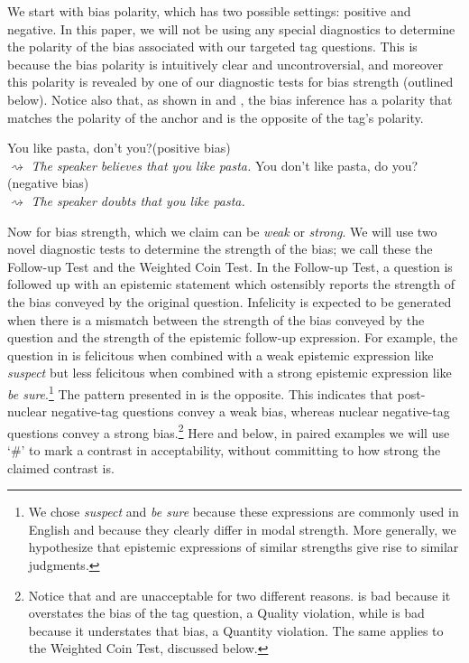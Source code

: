 \documentclass[output=paper,colorlinks,citecolor=brown]{langscibook}
\begin{document}
We start with bias polarity, which has two possible settings: positive and negative. In this paper, we will not be using any special diagnostics to determine the polarity of the bias associated with our targeted tag questions. This is because the bias polarity is intuitively clear and uncontroversial, and moreover this polarity is revealed by one of our diagnostic tests for bias strength (outlined below). Notice also that, as shown in  and , the bias inference has a polarity that matches the polarity of the anchor and is the opposite of the tag's polarity. 

\is{}
\ea You like pasta, don't you?\hfill(positive bias)\\ $\rightsquigarrow$ \textit{The speaker believes that you like pasta.}\label{Bias.Pos}
\ex You don't like pasta, do you?\hfill(negative bias)\\ $\rightsquigarrow$ \textit{The speaker doubts that  you like pasta.}\label{Bias.Neg}
\z
{}

Now for bias strength, which we claim can be \textit{weak} or \textit{strong}. We will use two novel diagnostic tests to determine the strength of the bias; we call these the Follow-up Test and the Weighted Coin Test. In the Follow-up Test, a question is followed up with an epistemic statement which ostensibly reports the strength of the bias conveyed by the original question. Infelicity is expected to be generated when there is a mismatch between the strength of the bias conveyed by the question and the strength of the epistemic follow-up expression. For example, the question in  is felicitous when combined with a weak epistemic expression like \textit{suspect} but less felicitous when combined with a strong epistemic expression like \textit{be sure}.\footnote{We chose \textit{suspect} and \textit{be sure} because these expressions are commonly used in English and because they clearly differ in modal strength. More generally, we hypothesize that epistemic expressions of similar strengths give rise to similar judgments. } The pattern presented in  is the opposite. This indicates that  post-nuclear negative-tag questions convey a weak bias, whereas  nuclear negative-tag questions convey a strong bias.\footnote{Notice that  and  are unacceptable for two different reasons.  is bad because it overstates the bias of the tag question, a Quality violation,  while  is bad because it understates that bias, a Quantity violation. The same applies to the Weighted Coin Test, discussed below.} Here and below, in paired examples we will use `\#' to mark a contrast in acceptability, without committing to how strong the claimed contrast is.
\end{document}
